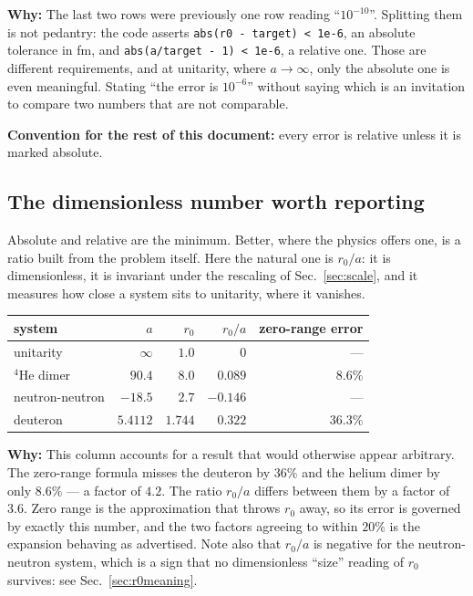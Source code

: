 \documentclass[11pt,a4paper]{article}
\newcommand{\why}[1]{\medskip\noindent\textbf{Why:} #1\medskip}
\begin{document}
\why{The last two rows were previously one row reading ``$10^{-10}$''. Splitting them
is not pedantry: the code asserts \texttt{abs(r0 - target) < 1e-6}, an absolute
tolerance in fm, and \texttt{abs(a/target - 1) < 1e-6}, a relative one. Those
are different requirements, and at unitarity, where $a\to\infty$, only the
absolute one is even meaningful. Stating ``the error is $10^{-6}$'' without
saying which is an invitation to compare two numbers that are not comparable.

\textbf{Convention for the rest of this document:} every error is relative
unless it is marked absolute.}

\subsection*{The dimensionless number worth reporting}
\label{sec:errors}

Absolute and relative are the minimum. Better, where the physics offers one, is
a ratio built from the problem itself. Here the natural one is $r_0/a$: it is
dimensionless, it is invariant under the rescaling of Sec.~\ref{sec:scale}, and
it measures how close a system sits to unitarity, where it vanishes.

\begin{center}
\begin{tabular}{lrrrr}
\toprule
system & $a$ & $r_0$ & $r_0/a$ & zero-range error \\
\midrule
unitarity & $\infty$ & $1.0$ & $0$ & --- \\
$^4$He dimer & $90.4$ & $8.0$ & $0.089$ & $8.6\%$ \\
neutron-neutron & $-18.5$ & $2.7$ & $-0.146$ & --- \\
deuteron & $5.4112$ & $1.744$ & $0.322$ & $36.3\%$ \\
\bottomrule
\end{tabular}
\end{center}

\why{This column accounts for a result that would otherwise appear arbitrary. The
zero-range formula misses the deuteron by $36\%$ and the helium dimer by only
$8.6\%$ --- a factor of $4.2$. The ratio $r_0/a$ differs between them by a factor
of $3.6$. Zero range is the approximation that throws $r_0$ away, so its error
is governed by exactly this number, and the two factors agreeing to within
$20\%$ is the expansion behaving as advertised. Note also that $r_0/a$ is
negative for the neutron-neutron system, which is a sign that no dimensionless
``size'' reading of $r_0$ survives: see Sec.~\ref{sec:r0meaning}.}
\end{document}
